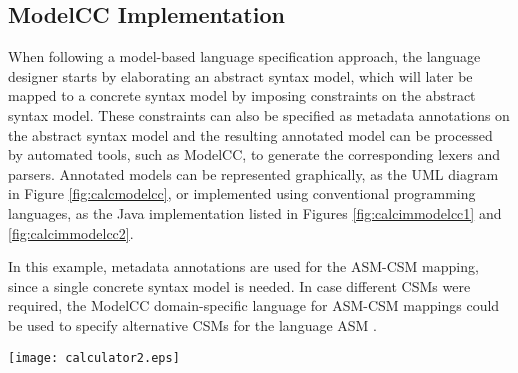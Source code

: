 \documentclass[preprint]{elsarticle}
\begin{document}
\subsection{ModelCC Implementation}

When following a model-based language specification approach, the language designer starts by elaborating an abstract syntax model, which will later be mapped to a concrete syntax model by imposing constraints on the abstract syntax model.
These constraints can also be specified as metadata annotations on the abstract syntax model and the resulting annotated model can be processed by automated tools, such as ModelCC, to generate the corresponding lexers and parsers.
Annotated models can be represented graphically, as the UML diagram in Figure \ref{fig:calcmodelcc}, or implemented using conventional programming languages, as the Java implementation listed in Figures \ref{fig:calcimmodelcc1} and \ref{fig:calcimmodelcc2}.

In this example, metadata annotations are used for the ASM-CSM mapping, since a single concrete syntax model is needed.
In case different CSMs were required, the ModelCC domain-specific language for ASM-CSM mappings could be used to specify alternative CSMs for the language ASM \cite{Quesada2014b}.

\begin{figure*}[tb!]
\centering
\texttt{[image: calculator2.eps]}
\caption{ModelCC specification of the arithmetic expression language.} \label{fig:calcmodelcc}
\end{figure*}
\end{document}
